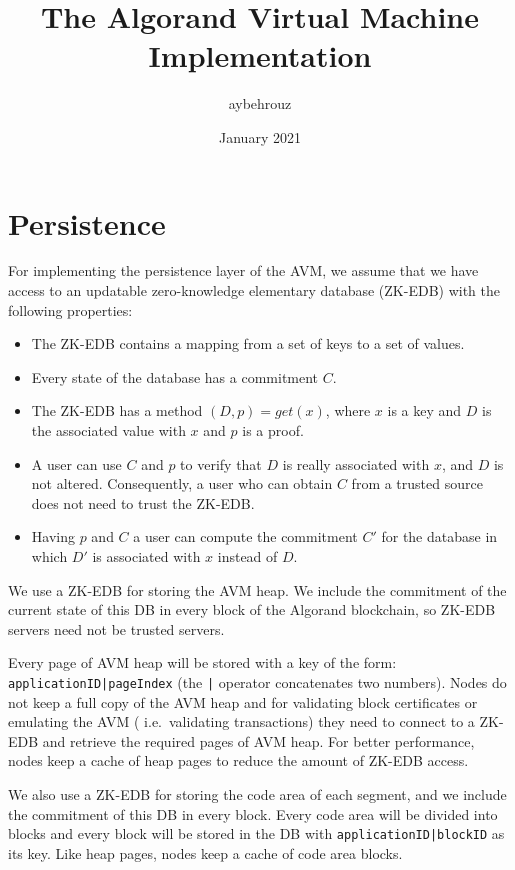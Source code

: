 \documentclass[11pt, A4]{article}
\title{The Algorand Virtual Machine Implementation}
\author{aybehrouz}
\date{January 2021}
\begin{document}
    \maketitle


    \section{Persistence}\label{sec:persistence}

    For implementing the persistence layer of the AVM, we assume that we have access to an updatable zero-knowledge
    elementary database (ZK-EDB) with the following properties:

    \begin{itemize}
        \item The ZK-EDB contains a mapping from a set of keys to a set of values.
        \item Every state of the database has a commitment \(C\).
        \item The ZK-EDB has a method \((D, p) = get(x)\), where \(x\) is a key and \(D\) is the associated value
        with \(x\) and \(p\) is a proof.
        \item A user can use \(C\) and \(p\) to verify that \(D\) is really associated with \(x\), and \(D\) is not
        altered. Consequently, a user who can obtain \(C\) from a trusted source does not need to trust the ZK-EDB.
        \item Having \(p\) and \(C\) a user can compute the commitment \(C'\) for the database in which \(D'\) is
        associated with \(x\) instead of \(D\).
    \end{itemize}

    We use a ZK-EDB for storing the AVM heap. We include the commitment of the current state of this DB in every
    block of the Algorand blockchain, so ZK-EDB servers need not be trusted servers.

    Every page of AVM heap will be stored with a key of the form: \texttt{applicationID|pageIndex} (the \texttt{|}
    operator concatenates two numbers). Nodes do not keep a full copy of the AVM heap and for validating block
    certificates or emulating the AVM ( i.e.~validating transactions) they need to connect to a ZK-EDB and retrieve
    the required pages of AVM heap. For better performance, nodes keep a cache of heap pages to
    reduce the amount of ZK-EDB access.

    We also use a ZK-EDB for storing the code area of each segment, and we include the commitment of this DB in every
    block. Every code area will be divided into blocks and every block will be stored in the DB with
    \texttt{applicationID|blockID} as its key. Like heap pages, nodes keep a cache of code area blocks.
\end{document}
